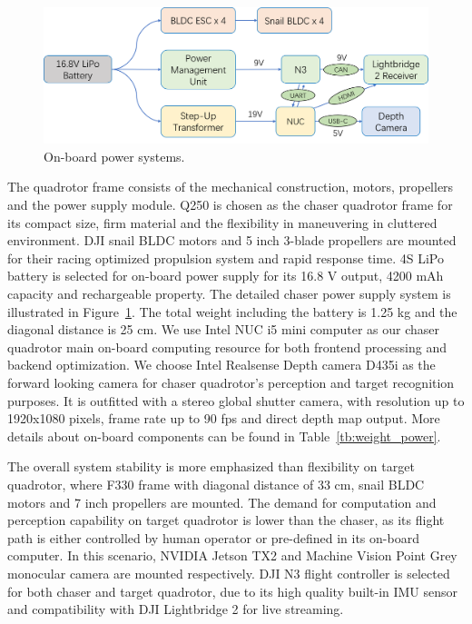 \begin{figure}[ht]
  \centering
  \includegraphics[width=1.0\textwidth]{figure/chapter_4/power_system.png}
  \caption{On-board power systems.}
  \label{fig:power_systems}
\end{figure}

The quadrotor frame consists of the mechanical construction, motors, propellers and the power supply module. Q250 is chosen as the chaser quadrotor frame for its compact size, firm material and the flexibility in maneuvering in cluttered environment. DJI snail BLDC motors and 5 inch 3-blade propellers are mounted for their racing optimized propulsion system and rapid response time. 4S LiPo battery is selected for on-board power supply for its 16.8 V output, 4200 mAh capacity and rechargeable property. The detailed chaser power supply system is illustrated in Figure~\ref{fig:power_systems}. The total weight including the battery is 1.25 kg and the diagonal distance is 25 cm. We use Intel NUC i5 mini computer as our chaser quadrotor main on-board computing resource for both frontend processing and backend optimization. We choose Intel Realsense Depth camera D435i as the forward looking camera for chaser quadrotor's perception and target recognition purposes. It is outfitted with a stereo global shutter camera, with resolution up to 1920x1080 pixels, frame rate up to 90 fps and direct depth map output. More details about on-board components can be found in Table~\ref{tb:weight_power}.

The overall system stability is more emphasized than flexibility on target quadrotor, where F330 frame with diagonal distance of 33 cm, snail BLDC motors and 7 inch propellers are mounted. The demand for computation and perception capability on target quadrotor is lower than the chaser, as its flight path is either controlled by human operator or pre-defined in its on-board computer. In this scenario, NVIDIA Jetson TX2 and Machine Vision Point Grey monocular camera are mounted respectively. DJI N3 flight controller is selected for both chaser and target quadrotor, due to its high quality built-in IMU sensor and compatibility with DJI Lightbridge 2 for live streaming.


